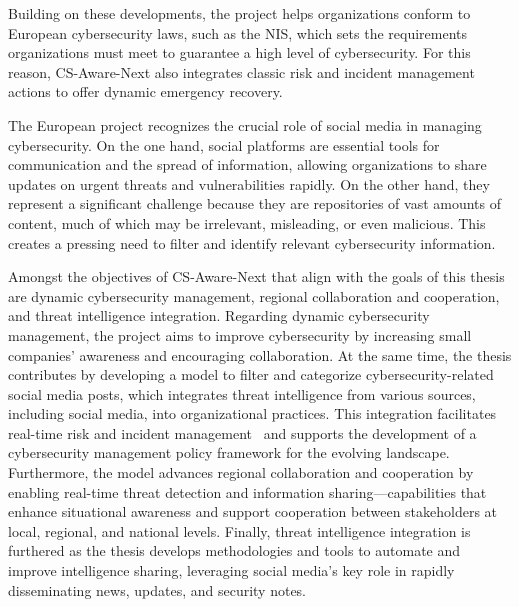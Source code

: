 Building on these developments, the project helps organizations conform to European cybersecurity laws, such as the NIS, which sets the requirements organizations must meet to guarantee a high level of cybersecurity. For this reason, CS-Aware-Next also integrates classic risk and incident management actions to offer dynamic emergency recovery.

The European project recognizes the crucial role of social media in managing cybersecurity. On the one hand, social platforms are essential tools for communication and the spread of information, allowing organizations to share updates on urgent threats and vulnerabilities rapidly. On the other hand, they represent a significant challenge because they are repositories of vast amounts of content, much of which may be irrelevant, misleading, or even malicious. This creates a pressing need to filter and identify relevant cybersecurity information.

Amongst the objectives of CS-Aware-Next that align with the goals of this thesis are dynamic cybersecurity management, regional collaboration and cooperation, and threat intelligence integration. Regarding dynamic cybersecurity management, the project aims to improve cybersecurity by increasing small companies' awareness and encouraging collaboration. At the same time, the thesis contributes by developing a model to filter and categorize cybersecurity-related social media posts, which integrates threat intelligence from various sources, including social media, into organizational practices. This integration facilitates real-time risk and incident management~\cite{dionisio2019} and supports the development of a cybersecurity management policy framework for the evolving landscape. Furthermore, the model advances regional collaboration and cooperation by enabling real-time threat detection and information sharing—capabilities that enhance situational awareness and support cooperation between stakeholders at local, regional, and national levels. Finally, threat intelligence integration is furthered as the thesis develops methodologies and tools to automate and improve intelligence sharing, leveraging social media's key role in rapidly disseminating news, updates, and security notes.

